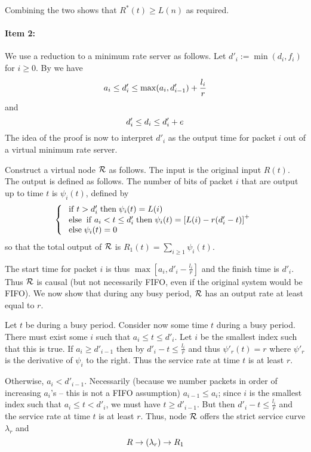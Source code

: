 Combining the two shows that $R^*(t) \geq L(n)$ as required.

 \paragraph{Item 2: }
 We use a reduction to a minimum rate server as follows. Let
 $d'_i:=\min(d_i, f_i)$ for $i\geq 0$. By  we
 have
\begin{equation}\mylabel{eq-ascpr98132}
  a_i \leq d'_i \leq \max(a_i, d'_{i-1}) + \frac{l_i}{r}
\end{equation}
and
\begin{equation}\mylabel{eq-ascpr98133}
  d'_i \leq d_i \leq d'_i + e
\end{equation}
The idea of the proof is now to interpret $d'_i$ as the output
time for packet $i$ out of a virtual minimum rate server.

Construct a virtual node $\mathcal R$ as follows. The input is the
original input $R(t)$. The output is defined as follows. The
number of bits of packet $i$ that are output up to time $t$ is
$\psi_i(t)$, defined by
 $$\left\{\begin{array}{l} 
 \mathrm{\; if \; } t > d'_i \mathrm{\; then \; } \psi_i(t)=L(i) \\
 \mathrm{\; else \; } \mathrm{\; if \; } a_i< t \leq d'_i \mathrm{\; then \; } \psi_i(t)=\left[L(i) -r (d'_i -t)\right]^+
 \\
 \mathrm{\; else \; } \psi_i(t)=0
 \end{array} \right.
$$
so that the total output of $\mathcal R$ is $R_1(t)=\sum_{i\geq
1}\psi_i(t)$.

The start time for packet $i$ is thus
$\max[a_i,d'_i-\frac{l_i}{r}]$ and the finish time is $d'_i$.
Thus $\mathcal R$ is causal (but not necessarily FIFO, even if the
original system would be FIFO).  We now show that during any
busy period, $\mathcal R$ has an output rate at least equal to $r$.

Let $t$ be during a busy period. Consider now some time $t$
during a busy period. There must exist some $i$ such that $a_i
\leq t \leq d'_i$. Let $i$ be the smallest index such that
this is true. If $a_i \geq d'_{i-1}$ then by
 $d'_i-t \leq \frac{l_i}{r}$ and thus
$\psi'_r(t) =r$ where $\psi'_r$ is the derivative of $\psi_i$
to the right. Thus the service rate at time $t$ is at least
$r$.

Otherwise, $ a_i < d'_{i-1}$. Necessarily (because we number
packets in order of increasing $a_i$'s -- this is not a FIFO
assumption) $a_{i-1} \leq a_i$; since $i$ is the smallest
index such that $a_i \leq t < d'_i$, we must have $t\geq
d'_{i-1}$. But then  $d'_i-t \leq \frac{l_i}{r}$ and the
service rate at time $t$ is at least $r$. Thus, node $\mathcal R$
offers the strict service curve $\lambda_r$ and
\begin{equation}\mylabel{eq-ascpr287}
  R \rightarrow (\lambda_r) \rightarrow R_1
\end{equation}




